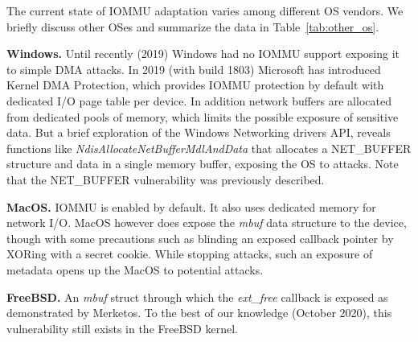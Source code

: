 The current state of IOMMU adaptation varies among different OS vendors. We briefly discuss other OSes and summarize the data in Table~\ref{tab:other_os}. 

\smallskip
\noindent\textbf{Windows.} Until recently (2019) Windows had no IOMMU support exposing it to simple DMA attacks\cite{thunder}.
In 2019 (with build 1803) Microsoft has introduced Kernel DMA Protection\cite{ms_iommu}, which provides IOMMU protection by default with dedicated I/O page table per device. 
In addition network buffers are allocated from dedicated pools of memory, which limits the possible exposure of sensitive data. But a brief exploration of the Windows Networking drivers API, reveals functions like \emph{NdisAllocateNetBufferMdlAndData}\cite{ms_single} that allocates a NET\_BUFFER structure and data in a single memory buffer, exposing the OS to \simple attacks. Note that the NET\_BUFFER vulnerability was previously described\cite{thunder}. 

\smallskip
\noindent\textbf{MacOS.} IOMMU is enabled by default. It also uses dedicated memory for network I/O. MacOS however does expose the \textit{mbuf} data structure to the device, though with some precautions such as blinding an exposed callback pointer by XORing with a secret cookie. While stopping \simple attacks, such an exposure of metadata opens up the MacOS to potential \compound attacks. 

\smallskip
\noindent\textbf{FreeBSD.} An \textit{mbuf} struct through which the \textit{ext\_free} callback is exposed as demonstrated by Merketos\cite{thunder}. To the best of our knowledge (October 2020), this vulnerability still exists in the FreeBSD kernel. 

